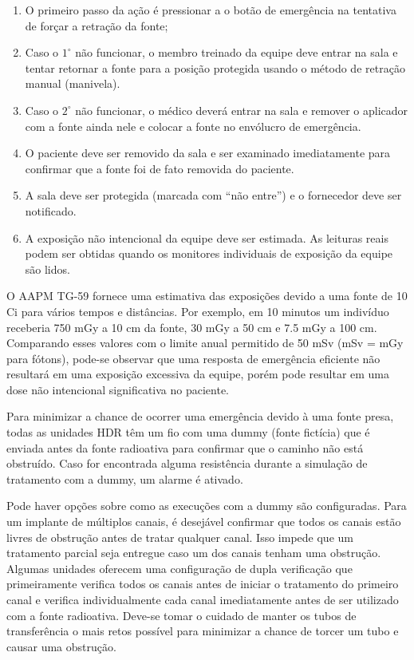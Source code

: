 \documentclass[11pt,a4paper]{article}
\newcounter{exemplo}
\begin{document}
	\begin{enumerate}[label=\textcolor{CarnationPink}{\arabic*${}^\circ$}]
		\item O primeiro passo da ação é pressionar a o botão de emergência na tentativa de forçar a retração da fonte;
		\item Caso o \textcolor{CarnationPink}{$\mathrm{1^{\circ}}$} não funcionar, o membro treinado da equipe deve entrar na sala e tentar retornar a fonte para a posição protegida usando o método de retração manual (manivela).
		\item Caso o \textcolor{CarnationPink}{$\mathrm{2^{\circ}}$} não funcionar, o médico deverá entrar na sala e remover o aplicador com a fonte ainda nele e colocar a fonte no envólucro de emergência.
		\item O paciente deve ser removido da sala e ser examinado imediatamente para confirmar que a fonte foi de fato removida do paciente.
		\item A sala deve ser protegida (marcada com “não entre”) e o fornecedor deve ser notificado.
		\item A exposição não intencional da equipe deve ser estimada. As leituras reais podem ser obtidas quando os monitores individuais de exposição da equipe são lidos.
	\end{enumerate}

	O AAPM TG-59 fornece uma estimativa das exposições devido a uma fonte de 10 Ci para vários tempos e distâncias. Por exemplo, em 10 minutos um indivíduo receberia 750 mGy a 10 cm da fonte, 30 mGy a 50 cm e 7.5 mGy a 100 cm. Comparando esses valores com o limite anual permitido de 50 mSv (mSv = mGy para fótons), pode-se observar que uma resposta de emergência eficiente não resultará em uma exposição excessiva da equipe, porém pode resultar em uma dose não intencional significativa no paciente.

	Para minimizar a chance de ocorrer uma emergência devido à uma fonte presa, todas as unidades HDR têm um fio com uma dummy (fonte fictícia) que é enviada antes da fonte radioativa para confirmar que o caminho não está obstruído. Caso for encontrada alguma resistência durante a simulação de tratamento com a dummy, um alarme é ativado.
	
	Pode haver opções sobre como as execuções com a dummy são configuradas. Para um implante de múltiplos canais, é desejável confirmar que todos os canais estão livres de obstrução antes de tratar qualquer canal. Isso impede que um tratamento parcial seja entregue caso um dos canais tenham uma obstrução. Algumas unidades oferecem uma configuração de dupla verificação que primeiramente verifica todos os canais antes de iniciar o tratamento do primeiro canal e verifica individualmente cada canal imediatamente antes de ser utilizado com a fonte radioativa. Deve-se tomar o cuidado de manter os tubos de transferência o mais retos possível para minimizar a chance de torcer um tubo e causar uma obstrução.
\end{document}
